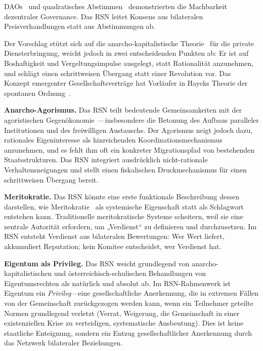 \documentclass[11pt,a4paper,twocolumn]{article}
\begin{document}
DAOs~\cite{buterin2014} und quadratisches Abstimmen~\cite{buterin2019} demonstrierten die Machbarkeit dezentraler Governance. Das RSN leitet Konsens aus bilateralen Preisverhandlungen statt aus Abstimmungen ab.

Der Vorschlag stützt sich auf die anarcho-kapitalistische Theorie~\cite{rothbard1973,hoppe2001} für die private Diensterbringung, weicht jedoch in zwei entscheidenden Punkten ab: Er ist auf Boshaftigkeit und Vergeltungsimpulse ausgelegt, statt Rationalität anzunehmen, und schlägt einen schrittweisen Übergang statt einer Revolution vor. Das Konzept emergenter Gesellschaftsverträge hat Vorläufer in Hayeks Theorie der spontanen Ordnung~\cite{hayek1973}.

\textbf{Anarcho-Agorismus.} Das RSN teilt bedeutende Gemeinsamkeiten mit der agoristischen Gegenökonomie~\cite{konkin2006}---insbesondere die Betonung des Aufbaus paralleler Institutionen und des freiwilligen Austauschs. Der Agorismus neigt jedoch dazu, rationales Eigeninteresse als hinreichenden Koordinationsmechanismus anzunehmen, und es fehlt ihm oft ein konkreter Migrationspfad von bestehenden Staatsstrukturen. Das RSN integriert ausdrücklich nicht-rationale Verhaltensneigungen und stellt einen fiskalischen Druckmechanismus für einen schrittweisen Übergang bereit.

\textbf{Meritokratie.} Das RSN könnte eine erste funktionale Beschreibung dessen darstellen, wie Meritokratie~\cite{young1958} als systemische Eigenschaft statt als Schlagwort entstehen kann. Traditionelle meritokratische Systeme scheitern, weil sie eine zentrale Autorität erfordern, um „Verdienst“ zu definieren und durchzusetzen. Im RSN entsteht Verdienst aus bilateralen Bewertungen: Wer Wert liefert, akkumuliert Reputation; kein Komitee entscheidet, wer Verdienst hat.

\textbf{Eigentum als Privileg.} Das RSN weicht grundlegend von anarcho-kapitalistischen und österreichisch-schulischen Behandlungen von Eigentumsrechten als natürlich und absolut ab. Im RSN-Rahmenwerk ist Eigentum ein \emph{Privileg}---eine gesellschaftliche Anerkennung, die in extremen Fällen von der Gemeinschaft zurückgezogen werden kann, wenn ein Teilnehmer geteilte Normen grundlegend verletzt (Verrat, Weigerung, die Gemeinschaft in einer existenziellen Krise zu verteidigen, systematische Ausbeutung). Dies ist keine staatliche Enteignung, sondern ein Entzug gesellschaftlicher Anerkennung durch das Netzwerk bilateraler Beziehungen.

\end{document}
